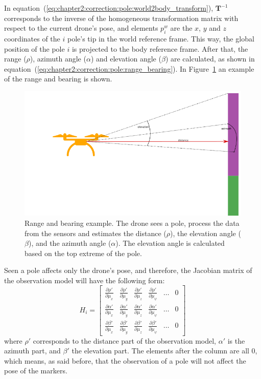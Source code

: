 In equation~(\ref{eq:chapter2:correction:pole:world2body_transform}), $\textbf{T}^{-1}$ corresponds to the inverse of the homogeneous transformation matrix with respect to the current drone's pose, and elements $p_i^w$ are the $x$, $y$ and $z$ coordinates of the $i$ pole's tip in the world reference frame. This way, the global position of the pole $i$ is projected to the body reference frame. After that, the range ($\rho$), azimuth angle ($\alpha$) and elevation angle ($\beta$) are calculated, as shown in equation~(\ref{eq:chapter2:correction:pole:range_bearing}). In Figure~\ref{fig:chapter2:correction:poles:range_bearing} an example of the range and bearing is shown.
\begin{figure}[h]
    \centering
    \includegraphics[width=\textwidth]{Figures/fig7-range_and_bearing}
    \caption[Range and Bearing example]{Range and bearing example. The drone sees a pole, process the data from the sensors and estimates the distance ($\rho$), the elevation angle ($\beta$), and the azimuth angle ($\alpha$). The elevation angle is calculated based on the top extreme of the pole.}
    \label{fig:chapter2:correction:poles:range_bearing}
\end{figure}

Seen a pole affects only the drone's pose, and therefore, the Jacobian matrix of the observation model will have the following form:
\begin{equation}
    H_i = \begin{bmatrix}
        \frac{\partial \rho'}{\partial \mu_x} & \frac{\partial \rho'}{\partial \mu_y} & \frac{\partial \rho'}{\partial \mu_z} & \frac{\partial \rho'}{\partial \mu_{\psi}} & \dots & 0 \\
        \frac{\partial \alpha'}{\partial \mu_x} & \frac{\partial \alpha'}{\partial \mu_y} & \frac{\partial \alpha'}{\partial \mu_z} & \frac{\partial \alpha'}{\partial \mu_{\psi}} & \dots & 0 \\
        \frac{\partial \beta'}{\partial \mu_x} & \frac{\partial \beta'}{\partial \mu_y} & \frac{\partial \beta'}{\partial \mu_z} & \frac{\partial \beta'}{\partial \mu_{\psi}} & \dots & 0
    \end{bmatrix}
\end{equation}
where $\rho'$ corresponds to the distance part of the observation model, $\alpha'$ is the azimuth part, and $ \beta'$ the elevation part. The elements after the  column are all 0, which means, as said before, that the observation of a pole will not affect the pose of the markers.

